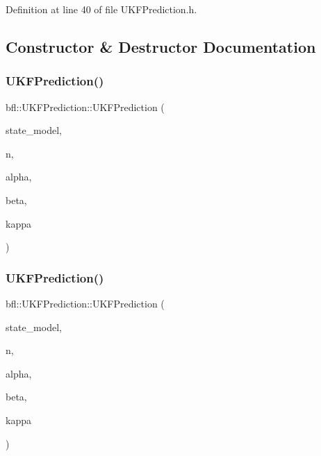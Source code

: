 Definition at line 40 of file U\+K\+F\+Prediction.\+h.



\subsection{Constructor \& Destructor Documentation}
\mbox{\label{classbfl_1_1UKFPrediction_a210e1d69d8a9235e13083a52be1012a3}} 
\subsubsection{\texorpdfstring{U\+K\+F\+Prediction()}{UKFPrediction()}\hspace{0.1cm}{\footnotesize\ttfamily [1/3]}}
{\footnotesize\ttfamily bfl\+::\+U\+K\+F\+Prediction\+::\+U\+K\+F\+Prediction (\begin{DoxyParamCaption}\item[{std\+::unique\+\_\+ptr$<$ \mbox{\hyperlink{classbfl_1_1StateModel}{bfl\+::\+State\+Model}} $>$}]{state\+\_\+model,  }\item[{const size\+\_\+t}]{n,  }\item[{const double}]{alpha,  }\item[{const double}]{beta,  }\item[{const double}]{kappa }\end{DoxyParamCaption})\hspace{0.3cm}{\ttfamily [noexcept]}}

\mbox{\label{classbfl_1_1UKFPrediction_ac6bcd034d265cc5f865ec77f38b8701e}} 
\subsubsection{\texorpdfstring{U\+K\+F\+Prediction()}{UKFPrediction()}\hspace{0.1cm}{\footnotesize\ttfamily [2/3]}}
{\footnotesize\ttfamily bfl\+::\+U\+K\+F\+Prediction\+::\+U\+K\+F\+Prediction (\begin{DoxyParamCaption}\item[{std\+::unique\+\_\+ptr$<$ \mbox{\hyperlink{classbfl_1_1AdditiveStateModel}{bfl\+::\+Additive\+State\+Model}} $>$}]{state\+\_\+model,  }\item[{const size\+\_\+t}]{n,  }\item[{const double}]{alpha,  }\item[{const double}]{beta,  }\item[{const double}]{kappa }\end{DoxyParamCaption})\hspace{0.3cm}{\ttfamily [noexcept]}}

